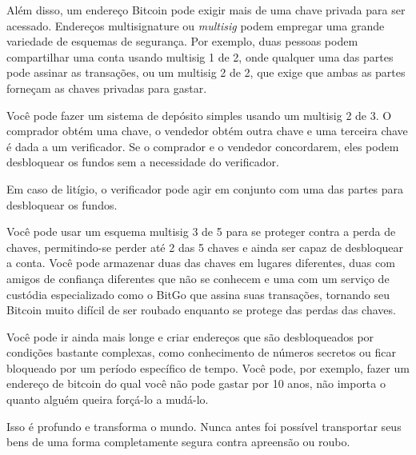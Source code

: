 Além disso, um endereço Bitcoin pode exigir mais de uma chave privada para ser acessado. Endereços multisignature ou \textit{multisig} podem empregar uma grande variedade de esquemas de segurança. Por exemplo, duas pessoas podem compartilhar uma conta usando multisig 1 de 2, onde qualquer uma das partes pode assinar as transações, ou um multisig 2 de 2, que exige que ambas as partes forneçam as chaves privadas para gastar.

Você pode fazer um sistema de depósito simples usando um multisig 2 de 3. O comprador obtém uma chave, o vendedor obtém outra chave e uma terceira chave é dada a um verificador. Se o comprador e o vendedor concordarem, eles podem desbloquear os fundos sem a necessidade do verificador.

Em caso de litígio, o verificador pode agir em conjunto com uma das partes para desbloquear os fundos.

Você pode usar um esquema multisig 3 de 5 para se proteger contra a perda de chaves, permitindo-se perder até 2 das 5 chaves e ainda ser capaz de desbloquear a conta. Você pode armazenar duas das chaves em lugares diferentes, duas com amigos de confiança diferentes que não se conhecem e uma com um serviço de custódia especializado como o BitGo que assina suas transações, tornando seu Bitcoin muito difícil de ser roubado enquanto se protege das perdas das chaves.

Você pode ir ainda mais longe e criar endereços que são desbloqueados por condições bastante complexas, como conhecimento de números secretos ou ficar bloqueado por um período específico de tempo. Você pode, por exemplo, fazer um endereço de bitcoin do qual você não pode gastar por 10 anos, não importa o quanto alguém queira forçá-lo a mudá-lo.

Isso é profundo e transforma o mundo. Nunca antes foi possível transportar seus bens de uma forma completamente segura contra apreensão ou roubo.